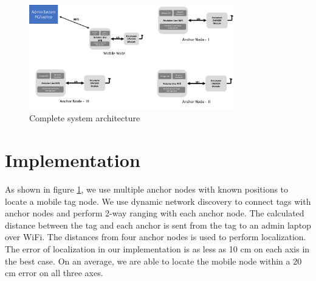 \documentclass[journal,transmag]{IEEEtran}
\begin{document}
\begin{figure}[!h]
\centering
\includegraphics[width=3.5in]{sysbd.png}
\caption{{Complete system architecture}}
\label{SYSTEMBD}
\end{figure}


\section{Implementation}
As shown in figure \ref{SYSTEMBD}, we use multiple anchor nodes with known positions to locate a mobile tag node. We use dynamic network discovery to connect tags with anchor nodes and perform 2-way ranging with each anchor node. The calculated distance between the tag and each anchor is sent from the tag to an admin laptop over WiFi. The distances from four anchor nodes is used to perform localization. The error of localization in our implementation is as less as 10 cm on each axis in the best case. On an average, we are able to locate the mobile node within a 20 cm error on all three axes. 
\end{document}
